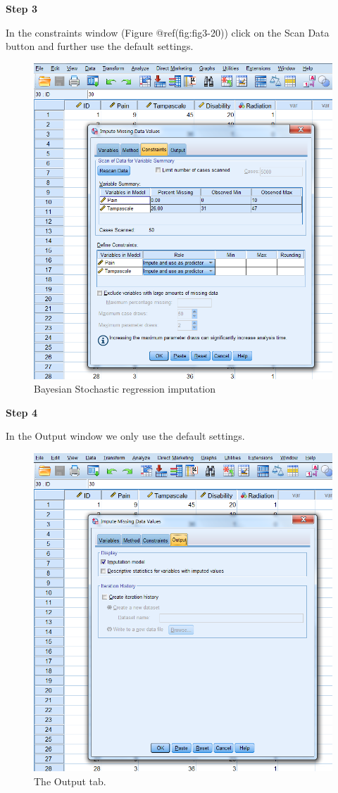 \documentclass[
]{book}
\begin{document}
\textbf{Step 3}

In the constraints window (Figure @ref(fig:fig3-20)) click on the Scan
Data button and further use the default settings.

\begin{figure}

{\centering \includegraphics[width=0.7\linewidth]{images/fig3.20} 

}

\caption{Bayesian Stochastic regression imputation}\label{fig:fig3-20}
\end{figure}

\textbf{Step 4}

In the Output window we only use the default settings.

\begin{figure}

{\centering \includegraphics[width=0.7\linewidth]{images/fig3.21} 

}

\caption{The Output tab.}\label{fig:fig3-21}
\end{figure}
\end{document}
